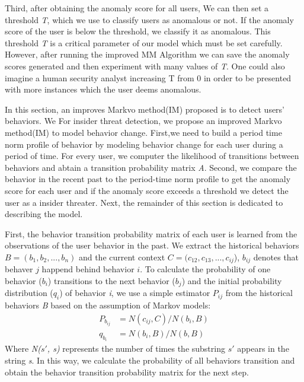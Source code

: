 \documentclass[conference]{IEEEtran}
\begin{document}
Third, after obtaining the anomaly score for all users, 
We can then set a threshold \emph{T}, which we use to classify users as anomalous or not. If the anomaly score of the user is below the threshold, we classify it as anomalous. This threshold \emph{T} is a critical parameter of our model which must be set carefully.
However, after running the improved MM Algorithm we can save the anomaly scores generated and then experiment with many values of \emph{T}. One could also imagine a human security analyst increasing T from 0 in order to be presented with more instances which the user deems anomalous.







\iffalse
In this section, an improves Markvo method(IM) proposed is to detect users' behaviors. 
We 
For insider threat detection, we propose an improved Markvo method(IM) to model behavior change. First,we need to build a period time norm profile of behavior by modeling behavior change for each user during a period of time. For every user, we computer the likelihood of transitions between behaviors and abtain a transition probability matrix \emph{A}.
Second, we compare the behavior in the recent past to
the period-time norm profile to get the anomaly score for each user and if the anomaly score exceeds a threshold we detect the user as a insider threater. 
Next, the remainder of this section is dedicated to describing the model.

First, the behavior transition probability matrix of each user is learned from the observations of the user behavior in the past. 
We extract the historical behaviors 
$B=(b_1, b_2, ..., b_n)$ and the current context $C = (c_{12},c_{13},..., c_{ij}$), $b_{ij}$ denotes that behaver $j$ happend behind behavior $i$. 
To calculate the probability of one behavior ($b_i$) transitions to the next behavior ($b_j$) and the initial probability distribution (\emph{$q_i$}) of behavior \emph{i}, 
we use a simple estimator $P_{ij}$ from the historical behaviors \emph{B} based on the assumption of Markov models\cite{b47}:
\begin{align}
P_{b_{ij}}&=N(c_{ij},C)/N(b_i,B)\\
q_{b_i}&=N({b_i},B)/N(b,B)
\end{align}
Where \emph{N($s\prime$, s)} represents the number of times the substring \emph{$s\prime$} appears in the string \emph{s}. In this way, we calculate the probability of all behaviors transition and obtain the behavior transition probability matrix for the next step.
\end{document}
